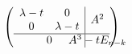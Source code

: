 \documentclass[12pt]{article}
\begin{document}
  \bgroup
  $\left(\begin{array}{c|c}
                          \begin{matrix}
                                  \lambda-t & 0\\0 & \lambda - t
                          \end{matrix} & A^2\\
                          \hline
                          \rule[-\dp0]{0pt}{\dimexpr \ht0+\dp0}%
                          0 & \mathmakebox[\wd0]{A^3 - tE_{n-k}}
   \end{array}\right)$
  \egroup
\end{document}
